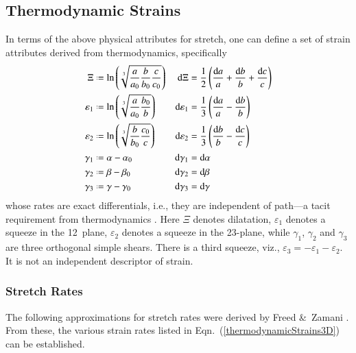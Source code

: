 \subsection{Thermodynamic Strains}

In terms of the above physical attributes for stretch, one can define a set of strain attributes derived from thermo\-dynamics, specifically \cite{Freed17}
\begin{subequations}
    \label{thermodynamicStrains3D}
    \begin{align}
    \Xi & \defeq \ln \left( \sqrt[3]{\frac{a}{a_0} \frac{b}{b_0} \frac{c}{c_0}} \right) & 
    \mathrm{d} \Xi & = \frac{1}{2} \left( \frac{\mathrm{d}a}{a} + 
    \frac{\mathrm{d}b}{b} + \frac{\mathrm{d}c}{c} \right) \\
    \varepsilon_1 & \defeq \ln \left( \sqrt[3]{\frac{a}{a_0} \frac{b_0}{b}} \right) &
    \mathrm{d} \varepsilon_1 & = \frac{1}{3} \left( \frac{\mathrm{d}a}{a} - 
    \frac{\mathrm{d}b}{b} \right) \\
    \varepsilon_2 & \defeq \ln \left( \sqrt[3]{\frac{b}{b_0} \frac{c_0}{c}} \right) &
    \mathrm{d} \varepsilon_2 & = \frac{1}{3} \left( \frac{\mathrm{d}b}{b} - 
    \frac{\mathrm{d}c}{c} \right) \\
    \gamma_1 & \defeq \alpha - \alpha_0 & 
    \mathrm{d} \gamma_1 & = \mathrm{d} \alpha \\
    \gamma_2 & \defeq \beta - \beta_0 & 
    \mathrm{d} \gamma_2 & = \mathrm{d} \beta \\
    \gamma_3 & \defeq \gamma - \gamma_0 & 
    \mathrm{d} \gamma_3 & = \mathrm{d} \gamma
    \end{align}
\end{subequations}
whose rates are exact differentials, i.e., they are independent of path---a tacit requirement from thermo\-dynamics \cite{Caratheodory09}.  Here $\Xi$ denotes dilatation, $\varepsilon_1$ denotes a squeeze in the 12~plane, $\varepsilon_2$ denotes a squeeze in the 23-plane, while $\gamma_1$, $\gamma_2$ and $\gamma_3$ are three orthogonal simple shears.  There is a third squeeze, viz., $\varepsilon_3 = -\varepsilon_1 - \varepsilon_2$. It is not an independent descriptor of strain.

\subsubsection{Stretch Rates}

The following approximations for stretch rates were derived by Freed \&\ Zamani \cite{FreedZamani18}.  From these, the various strain rates listed in Eqn.~(\ref{thermodynamicStrains3D}) can be established.  

